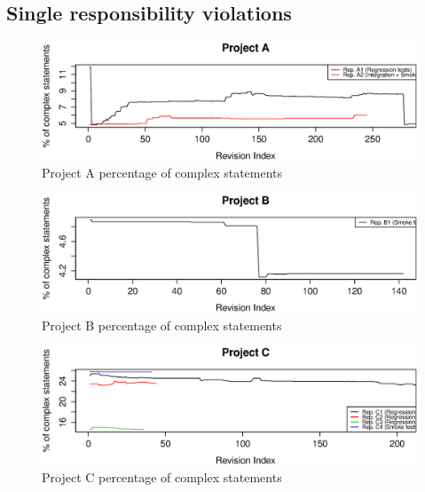 \FloatBarrier


\subsection{Single responsibility violations}

\begin{figure}[!htbp]
    \centering
    \includegraphics[width=\textwidth]{figure/results/rq1/statement_complexity_project_a.eps}
    \caption{Project A percentage of complex statements}
    \label{fig:statement_complexity_project_a}
\end{figure}

\begin{figure}[!htbp]
    \centering
    \includegraphics[width=\textwidth]{figure/results/rq1/statement_complexity_project_b.eps}
    \caption{Project B percentage of complex statements}
    \label{fig:statement_complexity_project_b}
\end{figure}

\begin{figure}[!htbp]
    \centering
    \includegraphics[width=\textwidth]{figure/results/rq1/statement_complexity_project_c.eps}
    \caption{Project C percentage of complex statements}
    \label{fig:statement_complexity_project_c}
\end{figure}

